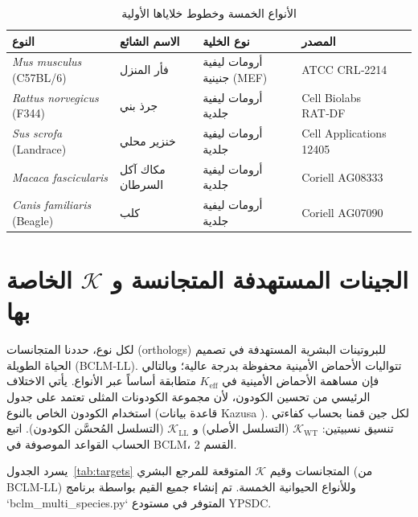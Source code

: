 \documentclass[11pt,a4paper]{article}
\newcommand{\REL}{\mathcal{K}}          %
\begin{document}
	\begin{table}[H]
		\centering
		\caption{الأنواع الخمسة وخطوط خلاياها الأولية}
		\label{tab:species}
		\begin{tabular}{@{}lllll@{}}
			\toprule
			\textbf{النوع} & \textbf{الاسم الشائع} & \textbf{نوع الخلية} & \textbf{المصدر} \\
			\midrule
			\textit{Mus musculus} (C57BL/6) & فأر المنزل & أرومات ليفية جنينية (MEF) & ATCC CRL‑2214 \\
			\textit{Rattus norvegicus} (F344) & جرذ بني & أرومات ليفية جلدية & Cell Biolabs RAT‑DF \\
			\textit{Sus scrofa} (Landrace) & خنزير محلي & أرومات ليفية جلدية & Cell Applications 12405 \\
			\textit{Macaca fascicularis} & مكاك آكل السرطان & أرومات ليفية جلدية & Coriell AG08333 \\
			\textit{Canis familiaris} (Beagle) & كلب & أرومات ليفية جلدية & Coriell AG07090 \\
			\bottomrule
		\end{tabular}
	\end{table}
	
	\section{الجينات المستهدفة المتجانسة و \(\REL\) الخاصة بها}
	\label{sec:genes}
	لكل نوع، حددنا المتجانسات (orthologs) للبروتينات البشرية المستهدفة في تصميم الحياة الطويلة (BCLM‑LL). تتواليات الأحماض الأمينية محفوظة بدرجة عالية؛ وبالتالي فإن مساهمة الأحماض الأمينية في \(K_{\mathrm{eff}}\) متطابقة أساساً عبر الأنواع. يأتي الاختلاف الرئيسي من تحسين الكودون، لأن مجموعة الكودونات المثلى تعتمد على جدول استخدام الكودون الخاص بالنوع (قاعدة بيانات Kazusa \cite{codon_usage_db}). لكل جين قمنا بحساب كفاءتي تنسيق نسبيتين: \(\REL_{\mathrm{WT}}\) (التسلسل الأصلي) و \(\REL_{\mathrm{LL}}\) (التسلسل المُحسَّن الكودون). اتبع الحساب القواعد الموصوفة في BCLM، القسم 2.
	
	يسرد الجدول~\ref{tab:targets} المتجانسات وقيم \(\REL\) المتوقعة للمرجع البشري (من BCLM‑LL) وللأنواع الحيوانية الخمسة. تم إنشاء جميع القيم بواسطة برنامج `bclm\_multi\_species.py` المتوفر في مستودع YPSDC.
	
\end{document}
